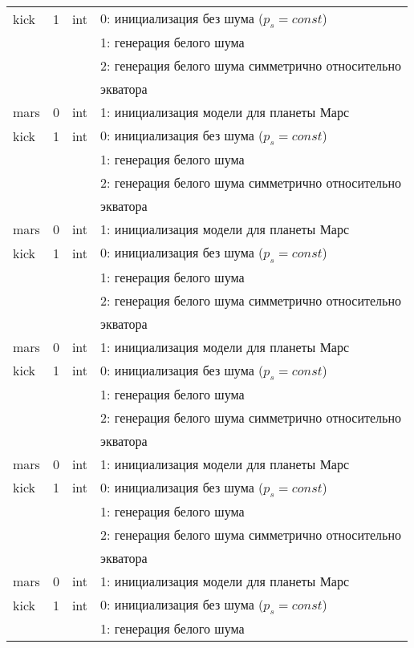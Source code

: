 \begin{longtable*}[c]{|l|c|l|l|}
kick & 1 & int & 0: инициализация без шума ($p_s = const$) \\
      &   &     & 1: генерация белого шума                  \\
      &   &     & 2: генерация белого шума симметрично относительно \\
  & & & экватора    \\
 mars & 0 & int & 1: инициализация модели для планеты Марс     \\
kick & 1 & int & 0: инициализация без шума ($p_s = const$) \\
      &   &     & 1: генерация белого шума                  \\
      &   &     & 2: генерация белого шума симметрично относительно \\
  & & & экватора    \\
 mars & 0 & int & 1: инициализация модели для планеты Марс     \\
kick & 1 & int & 0: инициализация без шума ($p_s = const$) \\
      &   &     & 1: генерация белого шума                  \\
      &   &     & 2: генерация белого шума симметрично относительно \\
  & & & экватора    \\
 mars & 0 & int & 1: инициализация модели для планеты Марс     \\
kick & 1 & int & 0: инициализация без шума ($p_s = const$) \\
      &   &     & 1: генерация белого шума                  \\
      &   &     & 2: генерация белого шума симметрично относительно \\
  & & & экватора    \\
 mars & 0 & int & 1: инициализация модели для планеты Марс     \\
kick & 1 & int & 0: инициализация без шума ($p_s = const$) \\
      &   &     & 1: генерация белого шума                  \\
      &   &     & 2: генерация белого шума симметрично относительно \\
  & & & экватора    \\
 mars & 0 & int & 1: инициализация модели для планеты Марс     \\
kick & 1 & int & 0: инициализация без шума ($p_s = const$) \\
      &   &     & 1: генерация белого шума                  \\

\end{longtable*}
